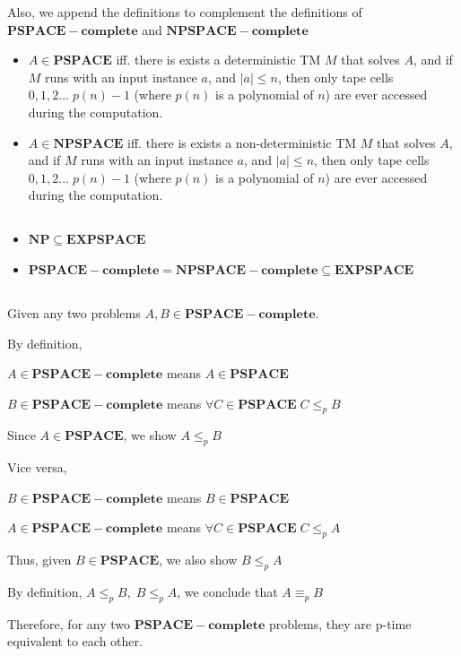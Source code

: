\documentclass[12pt]{article}
\begin{document}
Also, we append the definitions to complement the definitions of $\pmb{PSPACE-complete}$ and $\pmb{NPSPACE-complete}$
\begin{itemize}
    \item $A \in \pmb{PSPACE}$ iff. there is exists a deterministic TM $M$ that solves $A$, and if $M$ runs with an input instance $a$, and $|a| \leq n$, then only tape cells $0,1,2...\;p(n) - 1$ (where $p(n)$ is a polynomial of $n$) are ever accessed during the computation. 
    \item $A \in \pmb{NPSPACE}$ iff. there is exists a non-deterministic TM $M$ that solves $A$, and if $M$ runs with an input instance $a$, and $|a| \leq n$, then only tape cells $0,1,2...\;p(n) - 1$ (where $p(n)$ is a polynomial of $n$) are ever accessed during the computation. 
\end{itemize}

\subsection{}
\begin{itemize}
    \item $\pmb{NP} \subseteq \pmb{EXPSPACE}$
    \item $\pmb{PSPACE-complete} = \pmb{NPSPACE-complete} \subseteq \pmb{EXPSPACE}$
\end{itemize}

\subsection{}
Given any two problems $A, B \in \pmb{PSPACE-complete}$.

By definition,

$A \in \pmb{PSPACE-complete}$ means $A \in \pmb{PSPACE}$

$B \in \pmb{PSPACE-complete}$ means $\forall C \in \pmb{PSPACE}\; C \leq_p B $

Since $A \in \pmb{PSPACE}$, we show $ A \leq_p B $

Vice versa,

$B \in \pmb{PSPACE-complete}$ means $B \in \pmb{PSPACE}$

$A \in \pmb{PSPACE-complete}$ means $\forall C \in \pmb{PSPACE}\; C \leq_p A $

Thus, given $ B \in \pmb{PSPACE}$, we also show $B \leq_p A$

By definition, $A \leq_p B ,\; B \leq_p A$,  we conclude that $A \equiv_p B $

Therefore, for any two $\pmb{PSPACE-complete}$ problems, they are p-time equivalent to each other.
\end{document}
